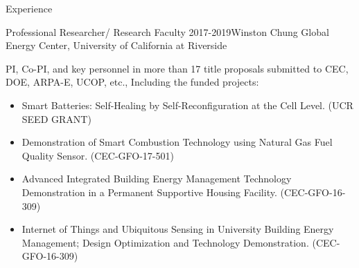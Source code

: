 \documentclass{resume} %
\begin{document}
\begin{rSection}{ Experience}
\begin{rSubsection}{Professional Researcher/  Research Faculty}{ 2017-2019}{Winston Chung Global Energy Center, University of California at Riverside}{}
   \item  []  PI,  Co-PI, and key personnel in more than 17 title proposals submitted to CEC, DOE, ARPA-E, UCOP, etc., Including the funded projects:
   \begin{itemize}
  \item  [] Smart Batteries: Self-Healing by Self-Reconfiguration at the Cell Level. (UCR SEED GRANT)
  \item [] Demonstration of Smart Combustion Technology using Natural Gas Fuel Quality Sensor. (CEC-GFO-17-501)
  \item [] Advanced Integrated Building Energy Management Technology Demonstration in a Permanent Supportive Housing Facility. (CEC-GFO-16-309)
  \item [] Internet of Things and Ubiquitous Sensing in University Building Energy Management; Design Optimization and Technology Demonstration. (CEC-GFO-16-309)
  
\end{itemize}
   
   
   
   
\end{rSubsection}



%
%
%
%
%





\end{rSection}
\end{document}
